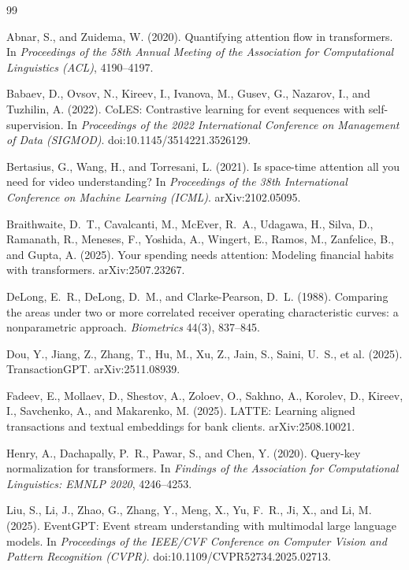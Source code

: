 \documentclass[12pt]{article}
\begin{document}
\begin{thebibliography}{99}
\raggedright

 Abnar, S., and Zuidema, W. (2020). Quantifying attention flow in transformers. In \emph{Proceedings of the 58th Annual Meeting of the Association for Computational Linguistics (ACL)}, 4190--4197.

 Babaev, D., Ovsov, N., Kireev, I., Ivanova, M., Gusev, G., Nazarov, I., and Tuzhilin, A. (2022). CoLES: Contrastive learning for event sequences with self-supervision. In \emph{Proceedings of the 2022 International Conference on Management of Data (SIGMOD)}. doi:10.1145/3514221.3526129.

 Bertasius, G., Wang, H., and Torresani, L. (2021). Is space-time attention all you need for video understanding? In \emph{Proceedings of the 38th International Conference on Machine Learning (ICML)}. arXiv:2102.05095.

 Braithwaite, D.~T., Cavalcanti, M., McEver, R.~A., Udagawa, H., Silva, D., Ramanath, R., Meneses, F., Yoshida, A., Wingert, E., Ramos, M., Zanfelice, B., and Gupta, A. (2025). Your spending needs attention: Modeling financial habits with transformers. arXiv:2507.23267.

 DeLong, E.~R., DeLong, D.~M., and Clarke-Pearson, D.~L. (1988). Comparing the areas under two or more correlated receiver operating characteristic curves: a nonparametric approach. \emph{Biometrics} 44(3), 837--845.

 Dou, Y., Jiang, Z., Zhang, T., Hu, M., Xu, Z., Jain, S., Saini, U.~S., et al. (2025). TransactionGPT. arXiv:2511.08939.

 Fadeev, E., Mollaev, D., Shestov, A., Zoloev, O., Sakhno, A., Korolev, D., Kireev, I., Savchenko, A., and Makarenko, M. (2025). LATTE: Learning aligned transactions and textual embeddings for bank clients. arXiv:2508.10021.

 Henry, A., Dachapally, P.~R., Pawar, S., and Chen, Y. (2020). Query-key normalization for transformers. In \emph{Findings of the Association for Computational Linguistics: EMNLP 2020}, 4246--4253.

 Liu, S., Li, J., Zhao, G., Zhang, Y., Meng, X., Yu, F.~R., Ji, X., and Li, M. (2025). EventGPT: Event stream understanding with multimodal large language models. In \emph{Proceedings of the IEEE/CVF Conference on Computer Vision and Pattern Recognition (CVPR)}. doi:10.1109/CVPR52734.2025.02713.


\end{thebibliography}
\end{document}
